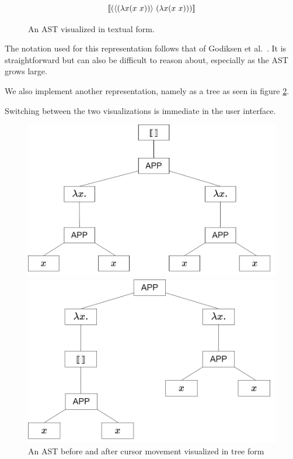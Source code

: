 \begin{figure}[H]
  \Large
  \begin{equation*}
    \llbracket (\langle (\lambda{x}{(x~x)}) \rangle~(\lambda{x}{(x~x)})) \rrbracket
  \end{equation*}
  \caption{An AST visualized in textual form.}
  \label{fig:ast-in-text-form}
\end{figure}

The notation used for this representation follows that of Godiksen
et al.~\pepm. It is straightforward but can also be
difficult to reason about, especially as the AST grows large.

We also implement another representation, namely as a tree as seen in
figure \ref{fig:ast_visual_tree}.

Switching between the two visualizations is immediate in the user interface.

\begin{figure}
  \center
  \noindent\begin{minipage}{.45\textwidth}
    \center
    \includegraphics[width=\textwidth]{assets/ast_root_cursor.png}
  \end{minipage}\hfill
  \begin{minipage}{.45\textwidth}
    \center
    \includegraphics[width=\textwidth]{assets/ast_subtree_cursor.png}
  \end{minipage}\hfill
  \caption{An AST before and after cursor movement visualized in tree form}
  \label{fig:ast_visual_tree}
\end{figure}

